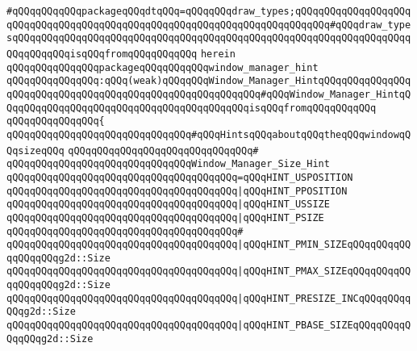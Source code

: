 \verb|#qQQqqQQqqQQqpackageqQQqdtqQQq=qQQqqQQqdraw_types;qQQqqQQqqQQqqQQqqQQqqQQqqQQqqQQqqQQqqQQqqQQqqQQqqQQqqQQqqQQqqQQqqQQqqQQqqQQq#qQQqdraw_typesqQQqqQQqqQQqqQQqqQQqqQQqqQQqqQQqqQQqqQQqqQQqqQQqqQQqqQQqqQQqqQQqqQQqqQQqqQQqqQQqisqQQqfromqQQqqQQqqQQq|\newline
\verb|herein|\newline
\newline
\newline
\verb|qQQqqQQqqQQqqQQqpackageqQQqqQQqqQQqwindow_manager_hint|\newline
\verb|qQQqqQQqqQQqqQQq:qQQq(weak)qQQqqQQqWindow_Manager_HintqQQqqQQqqQQqqQQqqQQqqQQqqQQqqQQqqQQqqQQqqQQqqQQqqQQqqQQqqQQq#qQQqWindow_Manager_HintqQQqqQQqqQQqqQQqqQQqqQQqqQQqqQQqqQQqqQQqqQQqisqQQqfromqQQqqQQqqQQq|\newline
\verb|qQQqqQQqqQQqqQQq{|\newline
\verb|qQQqqQQqqQQqqQQqqQQqqQQqqQQqqQQq#qQQqHintsqQQqaboutqQQqtheqQQqwindowqQQqsizeqQQq|\newline
\verb|qQQqqQQqqQQqqQQqqQQqqQQqqQQqqQQq#|\newline
\verb|qQQqqQQqqQQqqQQqqQQqqQQqqQQqqQQqWindow_Manager_Size_Hint|\newline
\verb|qQQqqQQqqQQqqQQqqQQqqQQqqQQqqQQqqQQqqQQq=qQQqHINT_USPOSITION|\newline
\verb|qQQqqQQqqQQqqQQqqQQqqQQqqQQqqQQqqQQqqQQq|\verb#|qQQqHINT_PPOSITION#\newline
\verb|qQQqqQQqqQQqqQQqqQQqqQQqqQQqqQQqqQQqqQQq|\verb#|qQQqHINT_USSIZE#\newline
\verb|qQQqqQQqqQQqqQQqqQQqqQQqqQQqqQQqqQQqqQQq|\verb#|qQQqHINT_PSIZE#\newline
\verb|qQQqqQQqqQQqqQQqqQQqqQQqqQQqqQQqqQQqqQQq#|\newline
\verb|qQQqqQQqqQQqqQQqqQQqqQQqqQQqqQQqqQQqqQQq|\verb#|qQQqHINT_PMIN_SIZEqQQqqQQqqQQqqQQqqQQqg2d::Size#\newline
\verb|qQQqqQQqqQQqqQQqqQQqqQQqqQQqqQQqqQQqqQQq|\verb#|qQQqHINT_PMAX_SIZEqQQqqQQqqQQqqQQqqQQqg2d::Size#\newline
\verb|qQQqqQQqqQQqqQQqqQQqqQQqqQQqqQQqqQQqqQQq|\verb#|qQQqHINT_PRESIZE_INCqQQqqQQqqQQqg2d::Size#\newline
\verb|qQQqqQQqqQQqqQQqqQQqqQQqqQQqqQQqqQQqqQQq|\verb#|qQQqHINT_PBASE_SIZEqQQqqQQqqQQqqQQqg2d::Size#\newline
